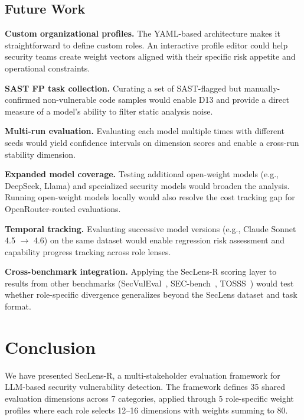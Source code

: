 \documentclass[10pt,twocolumn]{article}
\newcommand{\framework}{SecLens-R\xspace}
\newcommand{\seclens}{SecLens\xspace}
\begin{document}
\subsection{Future Work}

\textbf{Custom organizational profiles.} The YAML-based architecture makes it straightforward to define custom roles. An interactive profile editor could help security teams create weight vectors aligned with their specific risk appetite and operational constraints.

\textbf{SAST FP task collection.} Curating a set of SAST-flagged but manually-confirmed non-vulnerable code samples would enable D13 and provide a direct measure of a model's ability to filter static analysis noise.

\textbf{Multi-run evaluation.} Evaluating each model multiple times with different seeds would yield confidence intervals on dimension scores and enable a cross-run stability dimension.

\textbf{Expanded model coverage.} Testing additional open-weight models (e.g., DeepSeek, Llama) and specialized security models would broaden the analysis. Running open-weight models locally would also resolve the cost tracking gap for OpenRouter-routed evaluations.

\textbf{Temporal tracking.} Evaluating successive model versions (e.g., Claude Sonnet 4.5 $\to$ 4.6) on the same dataset would enable regression risk assessment and capability progress tracking across role lenses.

\textbf{Cross-benchmark integration.} Applying the \framework scoring layer to results from other benchmarks (SecVulEval~\citep{lu2025secvuleval}, SEC-bench~\citep{lee2025secbench}, TOSSS~\citep{damie2026tosss}) would test whether role-specific divergence generalizes beyond the \seclens dataset and task format.

\section{Conclusion}
\label{sec:conclusion}

We have presented \framework, a multi-stakeholder evaluation framework for LLM-based security vulnerability detection. The framework defines 35 shared evaluation dimensions across 7 categories, applied through 5 role-specific weight profiles where each role selects 12--16 dimensions with weights summing to 80.
\end{document}
